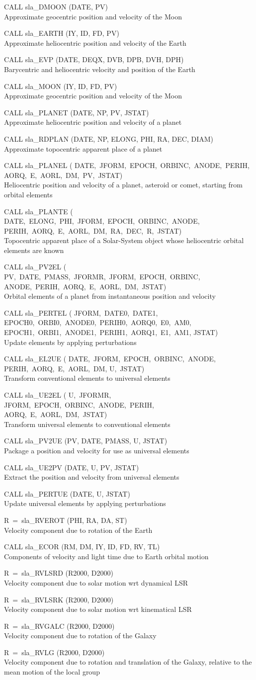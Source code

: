 \documentclass[11pt,twoside]{article}
\newcommand{\callhead}[1]{\goodbreak\vspace{\bigskipamount}{\large\bf{#1}}}
\newenvironment{callset}{\begin{list}{}{\setlength{\leftmargin}{2cm}
                             \setlength{\parsep}{\smallskipamount}}}{\end{list}}
\newcommand{\subp}[1]{\item\hspace{-1cm}#1\\}
\begin{document}
\callhead{Ephemerides}
\begin{callset}
\subp{CALL sla\_DMOON (DATE, PV)}
   Approximate geocentric position and velocity of the Moon
\subp{CALL sla\_EARTH (IY, ID, FD, PV)}
   Approximate heliocentric position and velocity of the Earth
\subp{CALL sla\_EVP (DATE, DEQX, DVB, DPB, DVH, DPH)}
   Barycentric and heliocentric velocity and position of the Earth
\subp{CALL sla\_MOON (IY, ID, FD, PV)}
   Approximate geocentric position and velocity of the Moon
\subp{CALL sla\_PLANET (DATE, NP, PV, JSTAT)}
   Approximate heliocentric position and velocity of a planet
\subp{CALL sla\_RDPLAN (DATE, NP, ELONG, PHI, RA, DEC, DIAM)}
   Approximate topocentric apparent place of a planet
\subp{CALL sla\_PLANEL (\vtop
                       {\hbox{DATE, JFORM, EPOCH, ORBINC, ANODE, PERIH,}
                      \hbox{AORQ, E, AORL, DM, PV, JSTAT)}}}
   Heliocentric position and velocity of a planet, asteroid or
   comet, starting from orbital elements
\subp{CALL sla\_PLANTE (\vtop
                       {\hbox{DATE, ELONG, PHI, JFORM, EPOCH, ORBINC, ANODE,}
                      \hbox{PERIH, AORQ, E, AORL, DM, RA, DEC, R, JSTAT)}}}
   Topocentric apparent place of a Solar-System object whose
   heliocentric orbital elements are known
\subp{CALL sla\_PV2EL (\vtop
                      {\hbox{PV, DATE, PMASS, JFORMR, JFORM, EPOCH, ORBINC,}
                     \hbox{ANODE, PERIH, AORQ, E, AORL, DM, JSTAT)}}}
   Orbital elements of a planet from instantaneous position and velocity
\subp{CALL sla\_PERTEL (\vtop
                       {\hbox{JFORM, DATE0, DATE1,}
                     \hbox{EPOCH0, ORBI0, ANODE0, PERIH0, AORQ0, E0, AM0,}
                     \hbox{EPOCH1, ORBI1, ANODE1, PERIH1, AORQ1, E1, AM1,}
                     \hbox{JSTAT)}}}
   Update elements by applying perturbations
\subp{CALL sla\_EL2UE (\vtop
                      {\hbox{DATE, JFORM, EPOCH, ORBINC, ANODE,}
                     \hbox{PERIH, AORQ, E, AORL, DM,}
                     \hbox{U, JSTAT)}}}
   Transform conventional elements to universal elements
\subp{CALL sla\_UE2EL (\vtop
                      {\hbox{U, JFORMR,}
                     \hbox{JFORM, EPOCH, ORBINC, ANODE, PERIH,}
                     \hbox{AORQ, E, AORL, DM, JSTAT)}}}
   Transform universal elements to conventional elements
\subp{CALL sla\_PV2UE (PV, DATE, PMASS, U, JSTAT)}
   Package a position and velocity for use as universal elements
\subp{CALL sla\_UE2PV (DATE, U, PV, JSTAT)}
   Extract the position and velocity from universal elements
\subp{CALL sla\_PERTUE (DATE, U, JSTAT)}
   Update universal elements by applying perturbations
\subp{R~=~sla\_RVEROT (PHI, RA, DA, ST)}
   Velocity component due to rotation of the Earth
\subp{CALL sla\_ECOR (RM, DM, IY, ID, FD, RV, TL)}
   Components of velocity and light time due to Earth orbital motion
\subp{R~=~sla\_RVLSRD (R2000, D2000)}
   Velocity component due to solar motion wrt dynamical LSR
\subp{R~=~sla\_RVLSRK (R2000, D2000)}
   Velocity component due to solar motion wrt kinematical LSR
\subp{R~=~sla\_RVGALC (R2000, D2000)}
   Velocity component due to rotation of the Galaxy
\subp{R~=~sla\_RVLG (R2000, D2000)}
   Velocity component due to rotation and translation of the
   Galaxy, relative to the mean motion of the local group
\end{callset}
\end{document}
